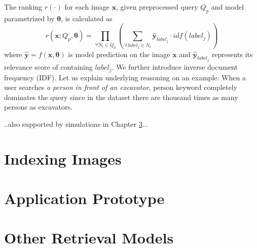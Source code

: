 The ranking $r(\cdot)$ for each image $\bm{x}$, given preprocessed query $Q_p$ and model parametrized by $\bm{\theta}$, is calculated as 
\begin{equation}
r\left(\bm{x}; Q_p, \bm{\theta}\right)=\prod\limits_{\forall N_i \in Q_p}\left(
	\sum\limits_{\forall label_j\in N_i} \bm{\hat{y}}_{label_j}\cdot idf\left(label_j\right)
\right)
\end{equation}
where $\bm{\hat{y}}=f\left(\bm{x}, \bm{\theta}\right)$  is model prediction on the image $\bm{x}$ and $\bm{\hat{y}}_{label_j}$ represents its relevance score of containing $label_j$. We further introduce inverse document frequency (IDF). Let us explain underlying reasoning on an example: When a user searches \textit{a person in front of an excavator}, person keyword completely dominates the query since in the dataset there are thousand times as many persons as excavators. 

..also supported by simulations in Chapter \ref{}...



\section{Indexing Images}
%	

\section{Application Prototype}

\section{Other Retrieval Models}